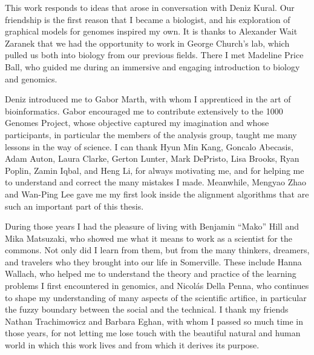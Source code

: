 
\begin{acknowledgements}

  This work responds to ideas that arose in conversation with Deniz Kural.
  Our friendship is the first reason that I became a biologist, and his exploration of graphical models for genomes inspired my own.
  It is thanks to Alexander Wait Zaranek that we had the opportunity to work in George Church's lab, which pulled us both into biology from our previous fields.
  There I met Madeline Price Ball, who guided me during an immersive and engaging introduction to biology and genomics.
  
  Deniz introduced me to Gabor Marth, with whom I apprenticed in the art of bioinformatics.
  Gabor encouraged me to contribute extensively to the 1000 Genomes Project, whose objective captured my imagination and whose participants, in particular the members of the analysis group, taught me many lessons in the way of science.
  I can thank Hyun Min Kang, Goncalo Abecasis, Adam Auton, Laura Clarke, Gerton Lunter, Mark DePristo, Lisa Brooks, Ryan Poplin, Zamin Iqbal, and Heng Li, for always motivating me, and for helping me to understand and correct the many mistakes I made.
  Meanwhile, Mengyao Zhao and Wan-Ping Lee gave me my first look inside the alignment algorithms that are such an important part of this thesis.

  During those years I had the pleasure of living with Benjamin ``Mako'' Hill and Mika Matsuzaki, who showed me what it means to work as a scientist for the commons.
  Not only did I learn from them, but from the many thinkers, dreamers, and travelers who they brought into our life in Somerville.
  These include Hanna Wallach, who helped me to understand the theory and practice of the learning problems I first encountered in genomics, and Nicol\'{a}s Della Penna, who continues to shape my understanding of many aspects of the scientific artifice, in particular the fuzzy boundary between the social and the technical.
  I thank my friends Nathan Trachimowicz and Barbara Eghan, with whom I passed so much time in those years, for not letting me lose touch with the beautiful natural and human world in which this work lives and from which it derives its purpose.
  

\end{acknowledgements}
